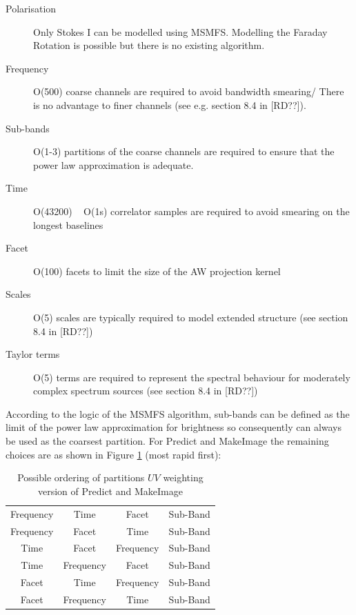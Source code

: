 \documentclass[11pt,a4paper,variablewidth]{article}
\begin{document}
\begin{description}
\item[Polarisation] Only Stokes I can be modelled using MSMFS. Modelling the Faraday Rotation is possible but there is no existing algorithm.
\item[Frequency] O(500) coarse channels are required to avoid bandwidth smearing/ There is no advantage to finer channels (see e.g. section 8.4 in [RD??]).
\item[Sub-bands] O(1-3) partitions of the coarse channels are required to ensure that the power law approximation is adequate.
\item[Time] O(43200) ~ O(1s) correlator samples are required to avoid smearing on the longest baselines
\item[Facet] O(100) facets to limit the size of the AW projection kernel
\item[Scales] O(5) scales are typically required to model extended structure (see section 8.4 in [RD??])
\item[Taylor terms] O(5) terms are required to represent the spectral behaviour for moderately complex spectrum sources (see section 8.4 in [RD??])
\end{description}

According to the logic of the MSMFS algorithm, sub-bands can be defined as the limit of the power law approximation for brightness so consequently can always be used as the coarsest partition. For Predict and MakeImage the remaining choices are as shown in Figure \ref{tab:partitions} (most rapid first):

\begin{table}[htp]
 \caption{Possible ordering of partitions $UV$ weighting version of Predict and MakeImage}
 \label{tab:partitions}
 \begin{center}
 \begin{tabular}{|c|c|c|c|}
\hline
Frequency & Time & Facet & Sub-Band \\
Frequency & Facet & Time & Sub-Band \\
Time & Facet & Frequency & Sub-Band \\
Time & Frequency & Facet & Sub-Band \\
Facet & Time & Frequency & Sub-Band \\
Facet & Frequency & Time & Sub-Band \\
\hline
\end{tabular}
\end{center}
\end{table}
\end{document}
